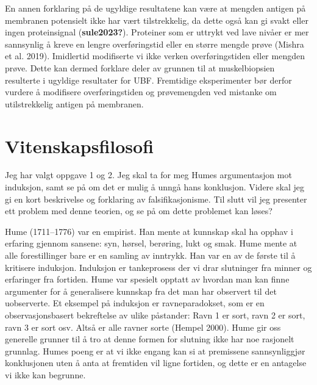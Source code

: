 \documentclass[
  letterpaper,
  DIV=11,
  numbers=noendperiod]{scrreprt}
\begin{document}
En annen forklaring på de ugyldige resultatene kan være at mengden
antigen på membranen potensielt ikke har vært tilstrekkelig, da dette
også kan gi svakt eller ingen proteinsignal (\textbf{sule2023?}).
Proteiner som er uttrykt ved lave nivåer er mer sannsynlig å kreve en
lengre overføringstid eller en større mengde prøve (Mishra et al. 2019).
Imidlertid modifiserte vi ikke verken overføringstiden eller mengden
prøve. Dette kan dermed forklare deler av grunnen til at muskelbiopsien
resulterte i ugyldige resultater for UBF. Fremtidige eksperimenter bør
derfor vurdere å modifisere overføringstiden og prøvemengden ved
mistanke om utilstrekkelig antigen på membranen.


\hypertarget{vitenskapsfilosofi}{%
\chapter{Vitenskapsfilosofi}\label{vitenskapsfilosofi}}

Jeg har valgt oppgave 1 og 2. Jeg skal ta for meg Humes argumentasjon
mot induksjon, samt se på om det er mulig å unngå hans konklusjon.
Videre skal jeg gi en kort beskrivelse og forklaring av
falsifikasjonisme. Til slutt vil jeg presenter ett problem med denne
teorien, og se på om dette problemet kan løses?

Hume (1711--1776) var en empirist. Han mente at kunnskap skal ha opphav
i erfaring gjennom sansene: syn, hørsel, berøring, lukt og smak. Hume
mente at alle forestillinger bare er en samling av inntrykk. Han var en
av de første til å kritisere induksjon. Induksjon er tankeprosess der vi
drar slutninger fra minner og erfaringer fra fortiden. Hume var spesielt
opptatt av hvordan man kan finne argumenter for å generalisere kunnskap
fra det man har observert til det uobserverte. Et eksempel på induksjon
er ravneparadokset, som er en observasjonsbasert bekreftelse av ulike
påstander: Ravn 1 er sort, ravn 2 er sort, ravn 3 er sort osv. Altså er
alle ravner sorte (Hempel 2000). Hume gir oss generelle grunner til å
tro at denne formen for slutning ikke har noe rasjonelt grunnlag. Humes
poeng er at vi ikke engang kan si at premissene sannsynliggjør
konklusjonen uten å anta at fremtiden vil ligne fortiden, og dette er en
antagelse vi ikke kan begrunne.
\end{document}
